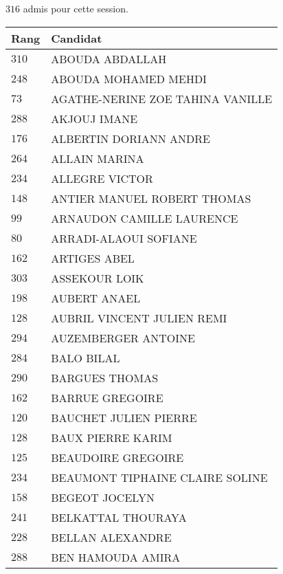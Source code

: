 




  $316$ admis pour cette session.

  \begin{xltabular}{\linewidth}{|l|X|}
    \hline
    \textbf{Rang} & \textbf{Candidat} \\
    \hline
    $310$ & ABOUDA ABDALLAH \\
    \hline
    $248$ & ABOUDA MOHAMED MEHDI \\
    \hline
    $73$ & AGATHE-NERINE ZOE TAHINA VANILLE \\
    \hline
    $288$ & AKJOUJ IMANE \\
    \hline
    $176$ & ALBERTIN DORIANN ANDRE \\
    \hline
    $264$ & ALLAIN MARINA \\
    \hline
    $234$ & ALLEGRE VICTOR \\
    \hline
    $148$ & ANTIER MANUEL ROBERT THOMAS \\
    \hline
    $99$ & ARNAUDON CAMILLE LAURENCE \\
    \hline
    $80$ & ARRADI-ALAOUI SOFIANE \\
    \hline
    $162$ & ARTIGES ABEL \\
    \hline
    $303$ & ASSEKOUR LOIK \\
    \hline
    $198$ & AUBERT ANAEL \\
    \hline
    $128$ & AUBRIL VINCENT JULIEN REMI \\
    \hline
    $294$ & AUZEMBERGER ANTOINE \\
    \hline
    $284$ & BALO BILAL \\
    \hline
    $290$ & BARGUES THOMAS \\
    \hline
    $162$ & BARRUE GREGOIRE \\
    \hline
    $120$ & BAUCHET JULIEN PIERRE \\
    \hline
    $128$ & BAUX PIERRE KARIM \\
    \hline
    $125$ & BEAUDOIRE GREGOIRE \\
    \hline
    $234$ & BEAUMONT TIPHAINE CLAIRE SOLINE \\
    \hline
    $158$ & BEGEOT JOCELYN \\
    \hline
    $241$ & BELKATTAL THOURAYA \\
    \hline
    $228$ & BELLAN ALEXANDRE \\
    \hline
    $288$ & BEN HAMOUDA AMIRA \\

\end{xltabular}

